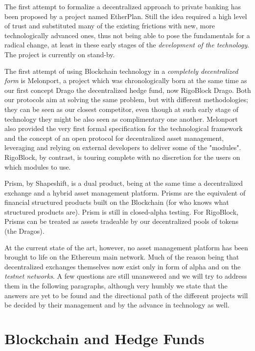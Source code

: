 \documentclass[9pt,oneside]{amsart}
\begin{document}
\begin{multicols}{2}
The first attempt to formalize a decentralized approach to private banking has been proposed by a project named EtherPlan. Still the idea required a high level of trust and substituted many of the existing frictions with new, more technologically advanced ones, thus not being able to pose the fundamentals for a radical change, at least in these early stages of the \textit{development of the technology}. The project is currently on stand-by.

The first attempt of using Blockchain technology in a \textit{completely decentralized form} is Melonport, a project which was chronologically born at the same time as our first concept Drago the decentralized hedge fund, now RigoBlock Drago. Both our protocols aim at solving the same problem, but with different methodologies; they can be seen as our closest competitor, even though at such early stage of technology they might be also seen as complimentary one another. Melonport also provided the very first formal specification for the technological framework and the concept of an open protocol for decentralized asset management, leveraging and relying on external developers to deliver some of the "modules". RigoBlock, by contrast, is touring complete with no discretion for the users on which modules to use.

Prism, by Shapeshift, is a dual product, being at the same time a decentralized exchange and a hybrid asset management platform. Prisms are the equivalent of financial structured products built on the Blockchain (for who knows what structured products are). Prism is still in closed-alpha testing. For RigoBlock, Prisms can be treated as assets tradeable by our decentralized pools of tokens (the Dragos).

At the current state of the art, however, no asset management platform has been brought to life on the Ethereum main network. Much of the reason being that decentralized exchanges themselves now exist only in form of alpha and on the \textit{testnet networks}. A few questions are still unanswered and we will try to address them in the following paragraphs, although very humbly we state that the answers are yet to be found and the directional path of the different projects will be decided by their management and by the advance in technology as well.


\section{Blockchain and Hedge Funds}\label{ch:conventions}


\end{multicols}
\end{document}
